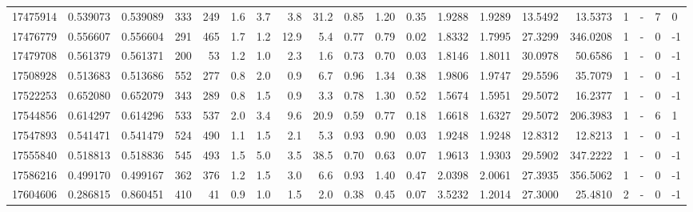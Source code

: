 \begin{tabular}{rrrrrrrrrrrrrrrrrlrl}
  17475914 & 0.539073 &   0.539089 &  333 &  249 &      1.6 &      3.7 &     3.8 &     31.2 &       0.85 &        1.20 &        0.35 &  1.9288 &  1.9289 &   13.5492 &   13.5373 &       1 &             - &        7 &         0 \\
  17476779 & 0.556607 &   0.556604 &  291 &  465 &      1.7 &      1.2 &    12.9 &      5.4 &       0.77 &        0.79 &        0.02 &  1.8332 &  1.7995 &   27.3299 &  346.0208 &       1 &             - &        0 &        -1 \\
  17479708 & 0.561379 &   0.561371 &  200 &   53 &      1.2 &      1.0 &     2.3 &      1.6 &       0.73 &        0.70 &        0.03 &  1.8146 &  1.8011 &   30.0978 &   50.6586 &       1 &             - &        0 &        -1 \\
  17508928 & 0.513683 &   0.513686 &  552 &  277 &      0.8 &      2.0 &     0.9 &      6.7 &       0.96 &        1.34 &        0.38 &  1.9806 &  1.9747 &   29.5596 &   35.7079 &       1 &             - &        0 &        -1 \\
  17522253 & 0.652080 &   0.652079 &  343 &  289 &      0.8 &      1.5 &     0.9 &      3.3 &       0.78 &        1.30 &        0.52 &  1.5674 &  1.5951 &   29.5072 &   16.2377 &       1 &             - &        0 &        -1 \\
  17544856 & 0.614297 &   0.614296 &  533 &  537 &      2.0 &      3.4 &     9.6 &     20.9 &       0.59 &        0.77 &        0.18 &  1.6618 &  1.6327 &   29.5072 &  206.3983 &       1 &             - &        6 &         1 \\
  17547893 & 0.541471 &   0.541479 &  524 &  490 &      1.1 &      1.5 &     2.1 &      5.3 &       0.93 &        0.90 &        0.03 &  1.9248 &  1.9248 &   12.8312 &   12.8213 &       1 &             - &        0 &        -1 \\
  17555840 & 0.518813 &   0.518836 &  545 &  493 &      1.5 &      5.0 &     3.5 &     38.5 &       0.70 &        0.63 &        0.07 &  1.9613 &  1.9303 &   29.5902 &  347.2222 &       1 &             - &        0 &        -1 \\
  17586216 & 0.499170 &   0.499167 &  362 &  376 &      1.2 &      1.5 &     3.0 &      6.6 &       0.93 &        1.40 &        0.47 &  2.0398 &  2.0061 &   27.3935 &  356.5062 &       1 &             - &        0 &        -1 \\
  17604606 & 0.286815 &   0.860451 &  410 &   41 &      0.9 &      1.0 &     1.5 &      2.0 &       0.38 &        0.45 &        0.07 &  3.5232 &  1.2014 &   27.3000 &   25.4810 &       2 &             - &        0 &        -1 \\

\end{tabular}
